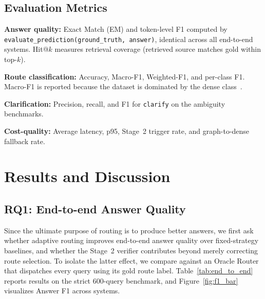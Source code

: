 ﻿\documentclass[11pt,twocolumn]{article}
\begin{document}
\subsection{Evaluation Metrics}
\label{subsec:metrics}

\textbf{Answer quality:} Exact Match (EM) and token-level F1 computed
by \texttt{evaluate\_prediction(ground\_truth, answer)}, identical
across all end-to-end systems. Hit@$k$ measures retrieval coverage
(retrieved source matches gold within top-$k$).

\textbf{Route classification:} Accuracy, Macro-F1, Weighted-F1, and
per-class F1. Macro-F1 is reported because the dataset is dominated by
the dense class~\cite{powers2011evaluation}.

\textbf{Clarification:} Precision, recall, and F1 for \texttt{clarify}
on the ambiguity benchmarks.

\textbf{Cost-quality:} Average latency, p95, Stage~2 trigger rate,
and graph-to-dense fallback rate.

\section{Results and Discussion}
\label{sec:results}

\subsection{RQ1: End-to-end Answer Quality}
\label{subsec:rq1}

Since the ultimate purpose of routing is to produce better answers, we
first ask whether adaptive routing improves end-to-end answer quality over
fixed-strategy baselines, and whether the Stage~2 verifier contributes
beyond merely correcting route selection. To isolate the latter effect, we
compare against an Oracle Router that dispatches every query using its gold
route label. Table~\ref{tab:end_to_end} reports results on the strict
$600$-query benchmark, and Figure~\ref{fig:f1_bar} visualizes Answer F1
across systems.
\end{document}
